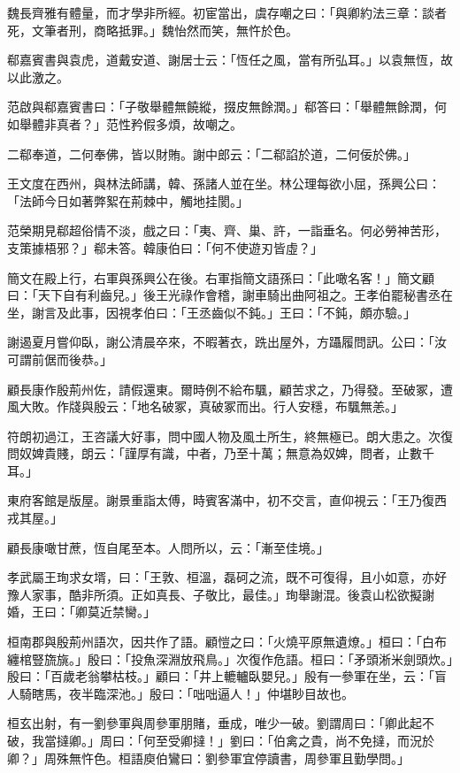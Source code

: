 魏長齊雅有體量，而才學非所經。初宦當出，虞存嘲之曰：「與卿約法三章：談者死，文筆者刑，商略抵罪。」魏怡然而笑，無忤於色。

郗嘉賓書與袁虎，道戴安道、謝居士云：「恆任之風，當有所弘耳。」以袁無恆，故以此激之。

范啟與郗嘉賓書曰：「子敬舉體無饒縱，掇皮無餘潤。」郗答曰：「舉體無餘潤，何如舉體非真者？」范性矜假多煩，故嘲之。

二郗奉道，二何奉佛，皆以財賄。謝中郎云：「二郗諂於道，二何佞於佛。」

王文度在西州，與林法師講，韓、孫諸人並在坐。林公理每欲小屈，孫興公曰：「法師今日如著弊絮在荊棘中，觸地挂閡。」

范榮期見郗超俗情不淡，戲之曰：「夷、齊、巢、許，一詣垂名。何必勞神苦形，支策據梧邪？」郗未答。韓康伯曰：「何不使遊刃皆虛？」

簡文在殿上行，右軍與孫興公在後。右軍指簡文語孫曰：「此噉名客！」簡文顧曰：「天下自有利齒兒。」後王光祿作會稽，謝車騎出曲阿祖之。王孝伯罷秘書丞在坐，謝言及此事，因視孝伯曰：「王丞齒似不鈍。」王曰：「不鈍，頗亦驗。」

謝遏夏月嘗仰臥，謝公清晨卒來，不暇著衣，跣出屋外，方躡履問訊。公曰：「汝可謂前倨而後恭。」

顧長康作殷荊州佐，請假還東。爾時例不給布颿，顧苦求之，乃得發。至破冢，遭風大敗。作牋與殷云：「地名破冢，真破冢而出。行人安穩，布颿無恙。」

符朗初過江，王咨議大好事，問中國人物及風土所生，終無極已。朗大患之。次復問奴婢貴賤，朗云：「謹厚有識，中者，乃至十萬；無意為奴婢，問者，止數千耳。」

東府客館是版屋。謝景重詣太傅，時賓客滿中，初不交言，直仰視云：「王乃復西戎其屋。」

顧長康噉甘蔗，恆自尾至本。人問所以，云：「漸至佳境。」

孝武屬王珣求女壻，曰：「王敦、桓溫，磊砢之流，既不可復得，且小如意，亦好豫人家事，酷非所須。正如真長、子敬比，最佳。」珣舉謝混。後袁山松欲擬謝婚，王曰：「卿莫近禁臠。」

桓南郡與殷荊州語次，因共作了語。顧愷之曰：「火燒平原無遺燎。」桓曰：「白布纏棺豎旒旐。」殷曰：「投魚深淵放飛鳥。」次復作危語。桓曰：「矛頭淅米劍頭炊。」殷曰：「百歲老翁攀枯枝。」顧曰：「井上轆轤臥嬰兒。」殷有一參軍在坐，云：「盲人騎瞎馬，夜半臨深池。」殷曰：「咄咄逼人！」仲堪眇目故也。

桓玄出射，有一劉參軍與周參軍朋賭，垂成，唯少一破。劉謂周曰：「卿此起不破，我當撻卿。」周曰：「何至受卿撻！」劉曰：「伯禽之貴，尚不免撻，而況於卿？」周殊無忤色。桓語庾伯鸞曰：劉參軍宜停讀書，周參軍且勤學問。」

